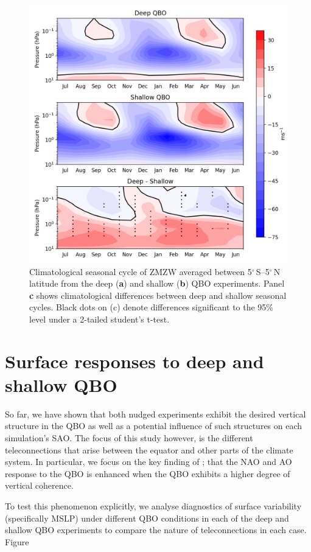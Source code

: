 \begin{figure}[h!]
\begin{center}
\noindent\includegraphics[width = 0.7\linewidth]{Figures/Figures-deepQBO/SAO_seasonal_cycles.png}
\caption[Climatological seasonal cycle of equatorial ZMZW in QBO experiments]{Climatological seasonal cycle of ZMZW averaged between 5$^{\circ}$\,S--5$^{\circ}$\,N latitude from the deep (\textbf{a}) and shallow (\textbf{b}) QBO experiments. Panel \textbf{c} shows climatological differences between deep and shallow seasonal cycles. Black dots on (c) denote differences significant to the 95\% level under a 2-tailed student's t-test.}
\label{fig:experiment_SAOs}
\end{center}
\end{figure}


\section{Surface responses to deep and shallow QBO}
\label{sec:vortex_responses_QBO}
So far, we have shown that both nudged experiments exhibit the desired vertical structure in the QBO as well as a potential influence of such structures on each simulation's SAO. The focus of this study however, is the different teleconnections that arise between the equator and other parts of the climate system. In particular, we focus on the key finding of \cite{andrewsObserved2019d}; that the NAO and AO response to the QBO is enhanced when the QBO exhibits a higher degree of vertical coherence. 

To test this phenomenon explicitly, we analyse  diagnostics of surface variability (specifically MSLP) under different QBO conditions in each of the deep and shallow QBO experiments to compare the nature of teleconnections in each case. Figure  

